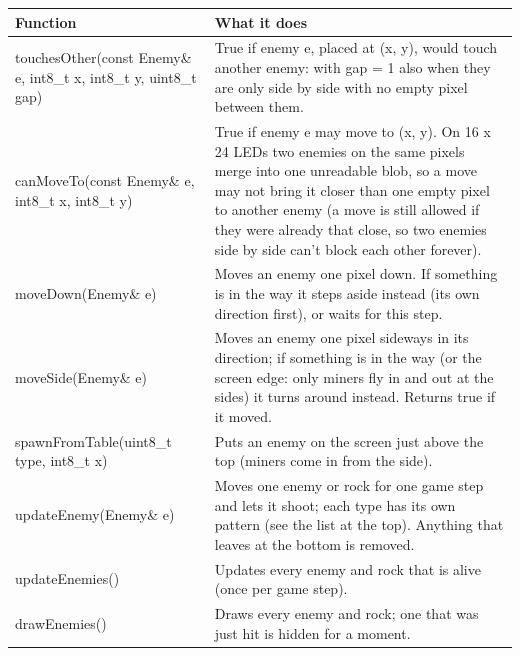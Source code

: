 \documentclass[11pt,a4paper]{article}
\begin{document}
\par\noindent\begin{minipage}{\linewidth}\centering\footnotesize
\begin{tabular}{|>{\raggedright\arraybackslash}p{5.82cm}|>{\raggedright\arraybackslash}p{10.68cm}|}
\hline\rowcolor{accent}\textbf{\color{white}Function} & \textbf{\color{white}What it does}\\\hline
touchesOther(const Enemy\& e, int8\_t x, int8\_t y, uint8\_t gap) & True if enemy e, placed at (x, y), would touch another enemy: with gap = 1 also when they are only side by side with no empty pixel between them.\\\hline
\rowcolor{rowshade}canMoveTo(const Enemy\& e, int8\_t x, int8\_t y) & True if enemy e may move to (x, y). On 16 x 24 LEDs two enemies on the same pixels merge into one unreadable blob, so a move may not bring it closer than one empty pixel to another enemy (a move is still allowed if they were already that close, so two enemies side by side can't block each other forever).\\\hline
moveDown(Enemy\& e) & Moves an enemy one pixel down. If something is in the way it steps aside instead (its own direction first), or waits for this step.\\\hline
\rowcolor{rowshade}moveSide(Enemy\& e) & Moves an enemy one pixel sideways in its direction; if something is in the way (or the screen edge: only miners fly in and out at the sides) it turns around instead. Returns true if it moved.\\\hline
spawnFromTable(uint8\_t type, int8\_t x) & Puts an enemy on the screen just above the top (miners come in from the side).\\\hline
\rowcolor{rowshade}updateEnemy(Enemy\& e) & Moves one enemy or rock for one game step and lets it shoot; each type has its own pattern (see the list at the top). Anything that leaves at the bottom is removed.\\\hline
updateEnemies() & Updates every enemy and rock that is alive (once per game step).\\\hline
\rowcolor{rowshade}drawEnemies() & Draws every enemy and rock; one that was just hit is hidden for a moment.\\\hline
\end{tabular}
\end{minipage}\par\medskip
\end{document}
